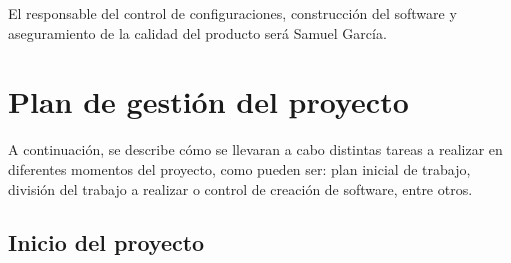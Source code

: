 \documentclass[11pt, a4paper, titlepage]{article}
\begin{document}
El responsable del control de configuraciones, construcción del software y aseguramiento de la calidad del producto será Samuel García.


\section{Plan de gestión del proyecto}

A continuación, se describe cómo se llevaran a cabo distintas tareas a realizar en diferentes momentos del proyecto, como pueden ser: plan inicial de trabajo, división del trabajo a realizar o control de creación de software, entre otros.

\subsection{Inicio del proyecto}
\end{document}
